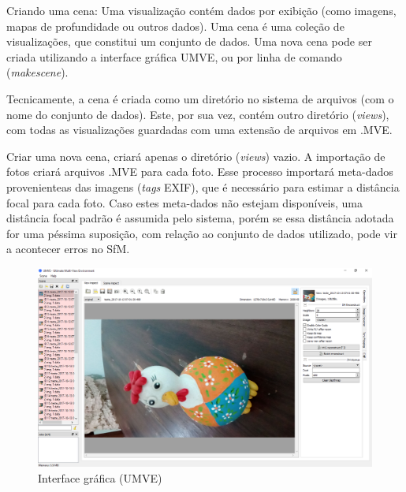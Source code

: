 Criando uma cena: Uma visualização contém dados por exibição (como imagens, mapas de profundidade ou outros dados). Uma cena é uma coleção de visualizações, que constitui um conjunto de dados. Uma nova cena pode ser criada utilizando a interface gráfica UMVE, ou por linha de comando (\emph{makescene}). 

Tecnicamente, a cena é criada como um diretório no sistema de arquivos (com o nome do conjunto de dados). Este, por sua vez, contém outro diretório (\emph{views}), com todas as visualizações guardadas com uma extensão de arquivos em .MVE.

Criar uma nova cena, criará apenas o diretório (\emph{views}) vazio. A importação de fotos criará arquivos .MVE para cada foto. Esse processo importará meta-dados provenienteas das imagens (\emph{tags} EXIF), que é necessário para estimar a distância focal para cada foto. Caso estes meta-dados não estejam disponíveis, uma distância focal padrão é assumida pelo sistema, porém se essa distância adotada for uma péssima suposição, com relação ao conjunto de dados utilizado, pode vir a acontecer erros no SfM.

\begin{figure}[!h]
	\centering
	\includegraphics[width=0.5\linewidth]{figs/umve1.png}
	\caption{%
	Interface gráfica (UMVE)%
	}\label{fig:mvesfm}
\end{figure}

